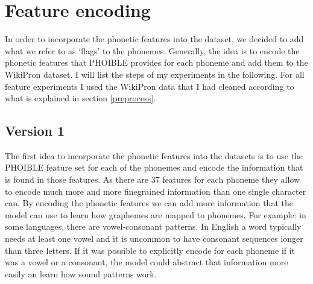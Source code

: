 \section{Feature encoding}
\label{sec:feature_enc}
In order to incorporate the phonetic features into the dataset, we decided to add what we refer to as `flags' to the phonemes. Generally, the idea is to encode the phonetic features that PHOIBLE provides for each phoneme and add them to the WikiPron dataset. I will list the steps of my experiments in the following. For all feature experiments I used the WikiPron data that I had cleaned according to what is explained in section \ref{preprocess}.

\subsection*{Version 1}

The first idea to incorporate the phonetic features into the datasets is to use the PHOIBLE feature set for each of the phonemes and encode the information that is found in those features. As there are 37 features for each phoneme they allow to encode much more and more finegrained information than one single character can. By encoding the phonetic features we can add more information that the model can use to learn how graphemes are mapped to phonemes. For example: in some languages, there are vowel-consonant patterns. In English a word typically needs at least one vowel and it is uncommon to have consonant sequences longer than three letters. If it was possible to explicitly encode for each phoneme if it was a vowel or a consonant, the model could abstract that information more easily an learn how sound patterns work. 

